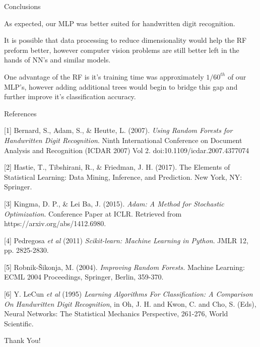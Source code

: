 \documentclass[titlepage,leqno]{beamer}%
\begin{document}
\begin{frame}{Conclusions}

As expected, our MLP was better suited for handwritten digit recognition. 

\vspace{3.75mm}

It is possible that data processing to reduce dimensionality would help the RF preform better, however computer vision problems are still better left in the hands of NN's and similar models. 

\vspace{3.75mm}

One advantage of the RF is it's training time was approximately $1/60^{th}$ of our MLP's, however adding additional trees would begin to bridge this gap and further improve it's classification accuracy. 

\end{frame}
\begin{frame}[fragile]{References}

\tiny

[1] Bernard, S., Adam, S., \& Heutte, L. (2007). \textit{Using Random Forests for Handwritten Digit Recognition}. Ninth International Conference on Document Analysis and Recognition (ICDAR 2007) Vol 2. doi:10.1109/icdar.2007.4377074

\vspace{3mm}

[2] Hastie, T., Tibshirani, R., \& Friedman, J. H. (2017). The Elements of Statistical Learning: Data Mining, Inference, and Prediction. New York, NY: Springer.

\vspace{3mm}

[3] Kingma, D. P., \& Lei Ba, J. (2015). 
\textit{Adam: A Method for Stochastic Optimization}. Conference Paper at ICLR. Retrieved from https://arxiv.org/abs/1412.6980.

\vspace{3mm}

[4] Pedregosa \textit{et al} (2011) \textit{Scikit-learn: Machine Learning in Python}. JMLR 12, pp. 2825-2830.

\vspace{3mm}

[5] Robnik-Šikonja, M. (2004). \textit{Improving Random Forests.} Machine Learning: ECML 2004 Proceedings, Springer, Berlin, 359-370.

\vspace{3mm}

[6] Y. LeCun \textit{et al} (1995) \textit{Learning Algorithms For Classification: A Comparison On Handwritten Digit Recognition}, in Oh, J. H. and Kwon, C. and Cho, S. (Eds), Neural Networks: The Statistical Mechanics Perspective, 261-276, World Scientific.

\end{frame}
\begin{frame}
	\begin{center}
	\begingroup
	\huge
	Thank You!\\
	\endgroup
	\end{center}
\end{frame}
\end{document}
